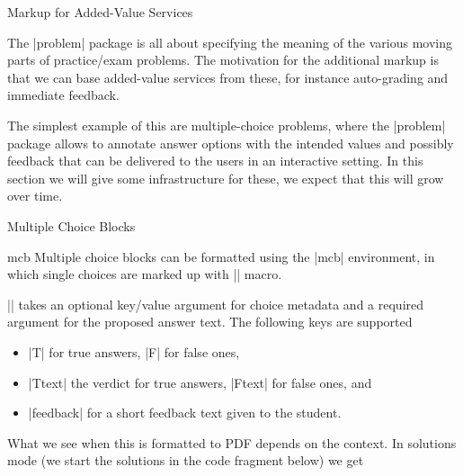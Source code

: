\begin{sfragment}{Markup for Added-Value Services}

\begin{sparagraph}
  The |problem| package is all about specifying the meaning of the various moving parts of
  practice/exam problems. The motivation for the additional markup is that we can base
  added-value services from these, for instance auto-grading and immediate feedback.

  The simplest example of this are multiple-choice problems, where the |problem| package
  allows to annotate answer options with the intended values and possibly feedback that
  can be delivered to the users in an interactive setting. In this section we will give
  some infrastructure for these, we expect that this will grow over time. 
\end{sparagraph}

\begin{sfragment}{Multiple Choice Blocks}
\begin{environment}{mcb}
  Multiple choice blocks can be formatted using the |mcb| environment, in which single
  choices are marked up with |\mcc| macro.
\end{environment}

\begin{function}{\mcc}
  || takes an optional key/value argument
   for choice metadata and a required argument  for the proposed
  answer text. The following keys are supported
  \begin{itemize}
  \item |T| for true answers, |F| for false ones,
  \item |Ttext| the verdict for true answers, |Ftext| for false ones, and
  \item |feedback| for a short feedback text given to the student.
  \end{itemize}
\end{function}
What we see when this is formatted to PDF depends on the context. In solutions mode (we
start the solutions in the code fragment below) we get



\end{sfragment}
\end{sfragment}
